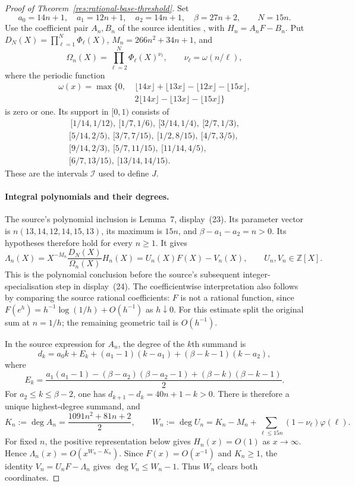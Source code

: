 \documentclass[11pt]{article}
\begin{document}
\begin{proof}[Proof of Theorem~\ref{res:rational-base-threshold}]
Set
\[
 a_0=14n+1,\quad a_1=12n+1,\quad a_2=14n+1,\quad\beta=27n+2,
 \qquad N=15n.
\]
Use the coefficient pair $A_n,B_n$ of the source identities
\cite[(8)--(11)]{zudilin2004}, with $H_n=A_nF-B_n$.
Put $D_N(X)=\prod_{\ell=1}^{N}\Phi_\ell(X)$,
$M_n=266n^2+34n+1$, and
\[
 \Omega_n(X)=\prod_{\ell=2}^{N}\Phi_\ell(X)^{\nu_\ell},
 \qquad \nu_\ell=\omega(n/\ell),
\]
where the periodic function
\[
\begin{split}
\omega(x)=\max\{0,&\ \lfloor14x\rfloor+\lfloor13x\rfloor
                  -\lfloor12x\rfloor-\lfloor15x\rfloor,\\
                &\ 2\lfloor14x\rfloor-\lfloor13x\rfloor
                  -\lfloor15x\rfloor\}
\end{split}
\]
is zero or one.  Its support in $[0,1)$ consists of
\[
\begin{gathered}
\,[1/14,1/12),\ [1/7,1/6),\ [3/14,1/4),\ [2/7,1/3),\\
[5/14,2/5),\ [3/7,7/15),\ [1/2,8/15),\ [4/7,3/5),\\
[9/14,2/3),\ [5/7,11/15),\ [11/14,4/5),\\
[6/7,13/15),\ [13/14,14/15).
\end{gathered}
\]
These are the intervals $\mathcal I$ used to define $J$.

\paragraph{Integral polynomials and their degrees.}
The source's polynomial inclusion is Lemma~7, display~(23).
Its parameter vector is $n(13,14,12,14,15,13)$, its maximum is $15n$, and
$\beta-a_1-a_2=n>0$.  Its hypotheses therefore hold for every $n\ge1$.
It gives
\[
 \Lambda_n(X)=X^{-M_n}\frac{D_N(X)}{\Omega_n(X)}H_n(X)
            =U_n(X)F(X)-V_n(X),\qquad U_n,V_n\in\mathbb Z[X].
\]
This is the polynomial conclusion before the source's subsequent
integer-specialisation step in display~(24).
The coefficientwise interpretation also follows by comparing the source
rational coefficients: $F$ is not a rational function, since
$F(e^h)=h^{-1}\log(1/h)+O(h^{-1})$ as $h\downarrow0$.
For this estimate split the original sum at $n=1/h$; the remaining geometric
tail is $O(h^{-1})$.

In the source expression for $A_n$, the degree of the $k$th summand is
\[
 d_k=a_0k+E_k+(a_1-1)(k-a_1)+(\beta-k-1)(k-a_2),
\]
where
\[
 E_k=\frac{a_1(a_1-1)-(\beta-a_2)(\beta-a_2-1)
                   +(\beta-k)(\beta-k-1)}2.
\]
For $a_2\le k\le\beta-2$, one has $d_{k+1}-d_k=40n+1-k>0$.
There is therefore a unique highest-degree summand, and
\[
 K_n:=\deg A_n=\frac{1091n^2+81n+2}{2},\qquad
 W_n:=\deg U_n=K_n-M_n+\sum_{\ell\le15n}(1-\nu_\ell)\varphi(\ell).
\]
For fixed $n$, the positive representation below gives $H_n(x)=O(1)$ as
$x\to\infty$.  Hence $\Lambda_n(x)=O(x^{W_n-K_n})$.
Since $F(x)=O(x^{-1})$ and $K_n\ge1$, the identity
$V_n=U_nF-\Lambda_n$ gives $\deg V_n\le W_n-1$.
Thus $W_n$ clears both coordinates.


\end{proof}
\end{document}
